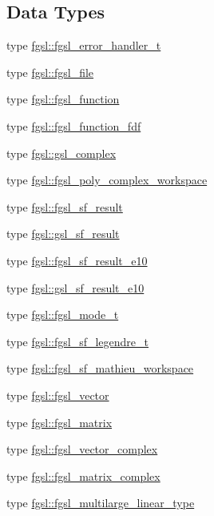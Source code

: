 \subsection*{Data Types}
\begin{DoxyCompactItemize}
\item 
type \hyperlink{structfgsl_1_1fgsl__error__handler__t}{fgsl\+::fgsl\+\_\+error\+\_\+handler\+\_\+t}
\item 
type \hyperlink{structfgsl_1_1fgsl__file}{fgsl\+::fgsl\+\_\+file}
\item 
type \hyperlink{structfgsl_1_1fgsl__function}{fgsl\+::fgsl\+\_\+function}
\item 
type \hyperlink{structfgsl_1_1fgsl__function__fdf}{fgsl\+::fgsl\+\_\+function\+\_\+fdf}
\item 
type \hyperlink{structfgsl_1_1gsl__complex}{fgsl\+::gsl\+\_\+complex}
\item 
type \hyperlink{structfgsl_1_1fgsl__poly__complex__workspace}{fgsl\+::fgsl\+\_\+poly\+\_\+complex\+\_\+workspace}
\item 
type \hyperlink{structfgsl_1_1fgsl__sf__result}{fgsl\+::fgsl\+\_\+sf\+\_\+result}
\item 
type \hyperlink{structfgsl_1_1gsl__sf__result}{fgsl\+::gsl\+\_\+sf\+\_\+result}
\item 
type \hyperlink{structfgsl_1_1fgsl__sf__result__e10}{fgsl\+::fgsl\+\_\+sf\+\_\+result\+\_\+e10}
\item 
type \hyperlink{structfgsl_1_1gsl__sf__result__e10}{fgsl\+::gsl\+\_\+sf\+\_\+result\+\_\+e10}
\item 
type \hyperlink{structfgsl_1_1fgsl__mode__t}{fgsl\+::fgsl\+\_\+mode\+\_\+t}
\item 
type \hyperlink{structfgsl_1_1fgsl__sf__legendre__t}{fgsl\+::fgsl\+\_\+sf\+\_\+legendre\+\_\+t}
\item 
type \hyperlink{structfgsl_1_1fgsl__sf__mathieu__workspace}{fgsl\+::fgsl\+\_\+sf\+\_\+mathieu\+\_\+workspace}
\item 
type \hyperlink{structfgsl_1_1fgsl__vector}{fgsl\+::fgsl\+\_\+vector}
\item 
type \hyperlink{structfgsl_1_1fgsl__matrix}{fgsl\+::fgsl\+\_\+matrix}
\item 
type \hyperlink{structfgsl_1_1fgsl__vector__complex}{fgsl\+::fgsl\+\_\+vector\+\_\+complex}
\item 
type \hyperlink{structfgsl_1_1fgsl__matrix__complex}{fgsl\+::fgsl\+\_\+matrix\+\_\+complex}
\item 
type \hyperlink{structfgsl_1_1fgsl__multilarge__linear__type}{fgsl\+::fgsl\+\_\+multilarge\+\_\+linear\+\_\+type}

\end{DoxyCompactItemize}
